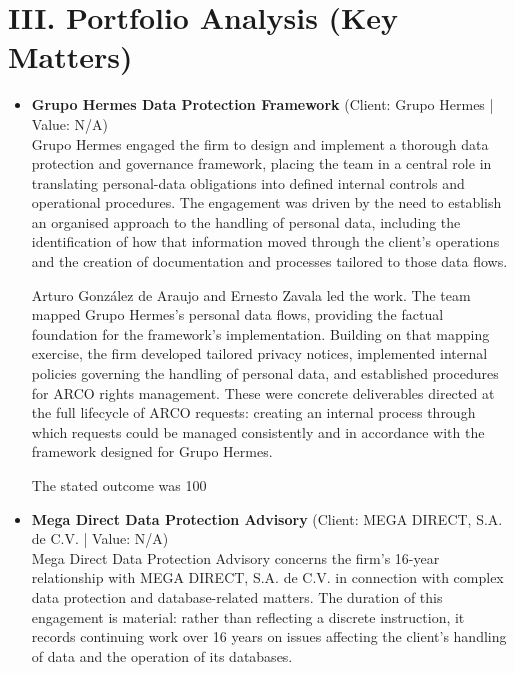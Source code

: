 \documentclass[11pt]{article}
\begin{document}
\section*{III. Portfolio Analysis (Key Matters)}
\begin{itemize}
\item \textbf{Grupo Hermes Data Protection Framework} (Client: Grupo Hermes | Value: N/A)\\ Grupo Hermes engaged the firm to design and implement a thorough data protection and governance framework, placing the team in a central role in translating personal-data obligations into defined internal controls and operational procedures. The engagement was driven by the need to establish an organised approach to the handling of personal data, including the identification of how that information moved through the client’s operations and the creation of documentation and processes tailored to those data flows.

Arturo González de Araujo and Ernesto Zavala led the work. The team mapped Grupo Hermes’s personal data flows, providing the factual foundation for the framework’s implementation. Building on that mapping exercise, the firm developed tailored privacy notices, implemented internal policies governing the handling of personal data, and established procedures for ARCO rights management. These were concrete deliverables directed at the full lifecycle of ARCO requests: creating an internal process through which requests could be managed consistently and in accordance with the framework designed for Grupo Hermes.

The stated outcome was 100%
\item \textbf{Mega Direct Data Protection Advisory} (Client: MEGA DIRECT, S.A. de C.V. | Value: N/A)\\ Mega Direct Data Protection Advisory concerns the firm’s 16-year relationship with MEGA DIRECT, S.A. de C.V. in connection with complex data protection and database-related matters. The duration of this engagement is material: rather than reflecting a discrete instruction, it records continuing work over 16 years on issues affecting the client’s handling of data and the operation of its databases.


\end{itemize}
\end{document}
